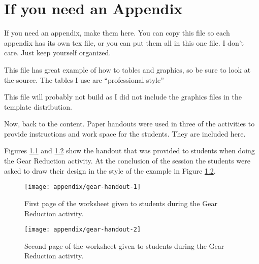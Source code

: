 \chapter{If you need an Appendix}

If you need an appendix, make them here. You can copy this file so each appendix has its own tex file, or you can put them all in this one file. I don't care. Just keep yourself organized.

This file has great example of how to tables and graphics, so be sure to look at the source. The tables I use are ``professional style'' 

This file will probably not build as I did not include the graphics files in the template distribution.

Now, back to the content. Paper handouts were used in three of the activities to provide instructions and work space for the students. They are included here.


	\label{sec:gearshandout}
	
	Figures \ref{fig:gearshandout1} and \ref{fig:gearshandout2} show the handout that was provided to students when doing the Gear Reduction activity. At the conclusion of the session the students were asked to draw their design in the style of the example in Figure \ref{fig:gearshandout2}.
	
\setlength\fboxsep{0pt}
\setlength\fboxrule{0.5pt}


	\begin{figure}
	\centering
	\texttt{[image: appendix/gear-handout-1]}
	\caption[Gear Reduction handout, page 1.]{First page of the worksheet given to students during the Gear Reduction activity.}
	\label{fig:gearshandout1}
	\end{figure}

	\begin{figure}
	\centering
	\texttt{[image: appendix/gear-handout-2]}
	\caption[Gear Reduction handout, page 2.]{Second page of the worksheet given to students during the Gear Reduction activity.}
	\label{fig:gearshandout2}
	\end{figure}


